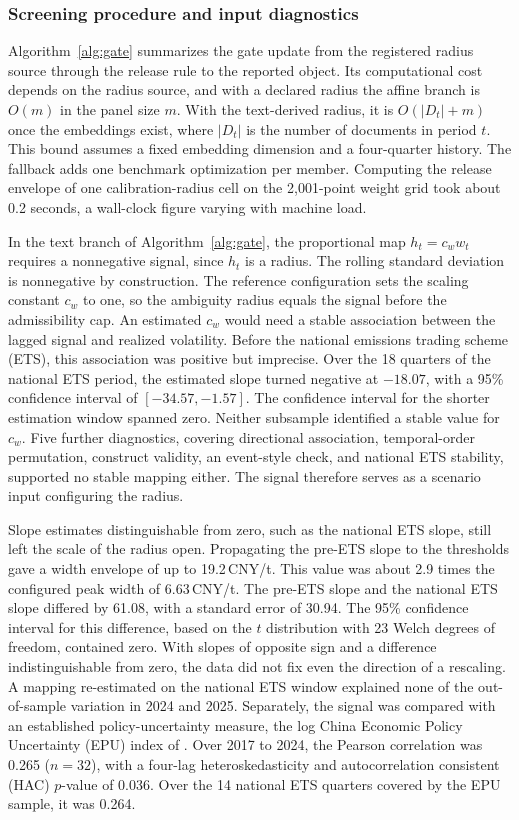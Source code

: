 \subsubsection{Screening procedure and input diagnostics}

Algorithm~\ref{alg:gate} summarizes the gate update from the registered radius source through the release rule to the reported object. Its computational cost depends on the radius source, and with a declared radius the affine branch is $O(m)$ in the panel size $m$. With the text-derived radius, it is $O(\lvert D_t\rvert+m)$ once the embeddings exist, where $\lvert D_t\rvert$ is the number of documents in period $t$. This bound assumes a fixed embedding dimension and a four-quarter history. The fallback adds one benchmark optimization per member. Computing the release envelope of one calibration-radius cell on the 2,001-point weight grid took about 0.2 seconds, a wall-clock figure varying with machine load.

In the text branch of Algorithm~\ref{alg:gate}, the proportional map $h_t=c_w w_t$ requires a nonnegative signal, since $h_t$ is a radius. The rolling standard deviation is nonnegative by construction. The reference configuration sets the scaling constant $c_w$ to one, so the ambiguity radius equals the signal before the admissibility cap. An estimated $c_w$ would need a stable association between the lagged signal and realized volatility. Before the national emissions trading scheme (ETS), this association was positive but imprecise. Over the 18 quarters of the national ETS period, the estimated slope turned negative at $-18.07$, with a 95\% confidence interval of $[-34.57,-1.57]$. The confidence interval for the shorter estimation window spanned zero. Neither subsample identified a stable value for $c_w$. Five further diagnostics, covering directional association, temporal-order permutation, construct validity, an event-style check, and national ETS stability, supported no stable mapping either. The signal therefore serves as a scenario input configuring the radius.

Slope estimates distinguishable from zero, such as the national ETS slope, still left the scale of the radius open. Propagating the pre-ETS slope to the thresholds gave a width envelope of up to 19.2\,CNY/t. This value was about 2.9 times the configured peak width of 6.63\,CNY/t. The pre-ETS slope and the national ETS slope differed by 61.08, with a standard error of 30.94. The 95\% confidence interval for this difference, based on the $t$ distribution with 23 Welch degrees of freedom, contained zero. With slopes of opposite sign and a difference indistinguishable from zero, the data did not fix even the direction of a rescaling. A mapping re-estimated on the national ETS window explained none of the out-of-sample variation in 2024 and 2025. Separately, the signal was compared with an established policy-uncertainty measure, the log China Economic Policy Uncertainty (EPU) index of \citet{Baker2016}. Over 2017 to 2024, the Pearson correlation was 0.265 ($n=32$), with a four-lag heteroskedasticity and autocorrelation consistent (HAC) $p$-value of 0.036. Over the 14 national ETS quarters covered by the EPU sample, it was 0.264.

